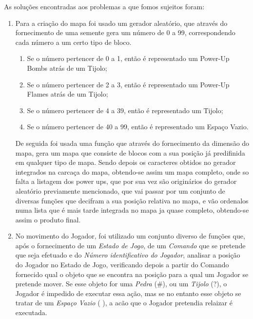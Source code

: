 \documentclass[a4paper]{article}
\begin{document}
As soluções encontradas aos problemas a que fomos sujeitos foram:
\begin{enumerate}
 \item Para a criação do mapa foi usado um gerador aleatório, que através do fornecimento de uma semente gera um número de 0 a 99, correspondendo cada número a um certo tipo de bloco.
 \begin{enumerate}
 \item Se o número pertencer de 0 a 1, então é representado um Power-Up Bombs atrás de um Tijolo;
 \item Se o número pertencer de 2 a 3, então é representado um Power-Up Flames atrás de um Tijolo;
 \item Se o número pertencer de 4 a 39, então é representado um Tijolo;
 \item Se o número pertencer de 40 a 99, então é representado um Espaço Vazio.
 \end{enumerate}

De seguida foi usada uma função que através do fornecimento da dimensão do mapa, gera um  mapa que consiste de blocos com a sua posição já predifinida em qualquer tipo de mapa. Sendo depois os caracteres obtidos no gerador integrados na carcaça do mapa, obtendo-se assim um mapa completo, onde so falta a listagem dos power ups, que por sua vez são originários do gerador aleatório previamente mencionado, que vai passar por um conjunto de diversas funções que decifram a sua posição relativa no mapa, e vão ordenalos numa lista que é mais tarde integrada no mapa ja quase completo, obtendo-se assim o produto final.

 \item No movimento do Jogador, foi utilizado um conjunto diverso de funções que, após o fornecimento de um \emph{Estado de Jogo}, de um \emph{Comando} que se pretende que seja efetuado e do \emph{Número identificativo do Jogador}, analisar a posição do Jogador no Estado de Jogo, verificando depois a partir do Comando fornecido qual o objeto que se encontra na posição para a qual um Jogador se pretende mover. Se esse objeto for uma \emph{Pedra} (\#), ou um \emph{Tijolo} (?), o Jogador é impedido de executar essa ação, mas se no entanto esse objeto se tratar de um \emph{Espaço Vazio} ( ), a acão que o Jogador pretendia relaizar é executada.
 

\end{enumerate}
\end{document}
